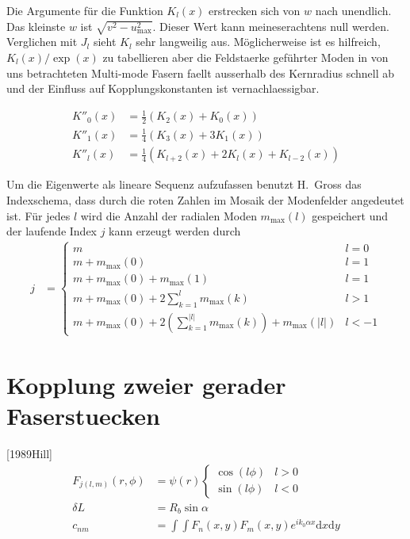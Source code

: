 \documentclass[DIV19,twocolumn]{scrartcl}
\def\({\left(}
\def\){\right)}
\newcommand{\mmax}{m_\textrm{max}}
\newcommand{\umax}{u_\textrm{max}}
\begin{document}
Die Argumente f\"ur die Funktion $K_l(x)$ erstrecken sich von $w$ nach
unendlich. Das kleinste $w$ ist $\sqrt{v^2-\umax^2}$. Dieser Wert kann
meineserachtens null werden. Verglichen mit $J_l$ sieht $K_l$ sehr
langweilig aus. M\"oglicherweise ist es hilfreich, $K_l(x)/\exp(x)$ zu
tabellieren aber die Feldstaerke gef\"uhrter Moden in von uns
betrachteten Multi-mode Fasern faellt ausserhalb des Kernradius
schnell ab und der Einfluss auf Kopplungskonstanten ist
vernachlaessigbar.


\begin{align}
  K''_0(x) &= \frac{1}{2}\(K_2(x)+K_0(x)\)\\
  K''_1(x) &= \frac{1}{4}\(K_3(x)+3K_1(x)\)\\
  K''_l(x) &= \frac{1}{4}\(K_{l+2}(x)+2K_l(x)+K_{l-2}(x)\)
\end{align}


Um die Eigenwerte als lineare Sequenz aufzufassen benutzt H.~Gross das
Indexschema, dass durch die roten Zahlen im Mosaik der Modenfelder
angedeutet ist. F\"ur jedes $l$ wird die Anzahl der radialen Moden
$\mmax(l)$ gespeichert und der laufende Index $j$ kann erzeugt werden
durch
\begin{align}
  j &= \begin{cases}
    m & l=0\\
    m+\mmax(0) & l=1\\
    m+\mmax(0)+\mmax(1) & l=1\\
    m+\mmax(0)+ 2\sum_{k=1}^l \mmax(k) & l>1 \\
    m+\mmax(0)+ 2\(\sum_{k=1}^{|l|} \mmax(k)\) + \mmax(|l|) & l<-1
\end{cases}
\end{align}

\section{Kopplung zweier gerader Faserstuecken}
[1989Hill]
\begin{align}
  F_{j(l,m)}(r,\phi) &= \psi(r) 
  \begin{cases}
    \cos(l \phi) & l>0\\  
    \sin(l \phi) & l<0
  \end{cases} \\
  \delta L &= R_b \sin\alpha\\
  c_{nm}&=\int\!\!\!\int\! F_n(x,y)F_m(x,y) e^{ik_0\alpha x} \textrm{d}x \textrm{d}y
\end{align}
\end{document}
